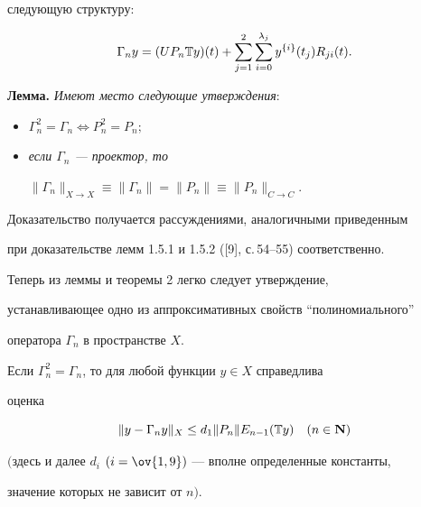 следующую структуру: 


\begin{equation} 


\Gamma_n y=(U P_n\Bbb T y)(t)+\sum^2_{j=1}\sum^{\lambda_j}_{i=0} 


y^{\{i\}}(t_j)R_{j i}(t). 


\end{equation} 


 


{\bf Лемма.} {\it Имеют место следующие утверждения}\/:


\begin{itemize} 


\item[(i)] $\Gamma^2_n=\Gamma_n\Longleftrightarrow P^2_n=P_n;$ 


\item[(ii)] {\it если $\Gamma_n$ --- проектор, то} 


$\|\Gamma_n\|_{X\to X}\equiv\|\Gamma_n\|=\|P_n\|\equiv 


\|P_n\|_{C\to C}$. 


\end{itemize}


\medskip 


 


Доказательство получается рассуждениями, аналогичными приведенным 


при доказательстве лемм 1.5.1 и 1.5.2 ([9], с.\,54--55) соответственно. 


 


Теперь из леммы и теоремы 2 легко следует утверждение, 


устанавливающее одно из аппроксимативных свойств ``полиномиального'' 


оператора $\Gamma_n$ в пространстве $X$. 


 


\begin{thm} 


Если $\Gamma^2_n=\Gamma_n$, то для любой функции $y\in X$ справедлива 


оценка 


$$ 


\|y-\Gamma_n y\|_X\le d_1\|P_n\|E_{n-1}(\Bbb T y)\quad 


(n\in\bold N) 


$$ 


$($здесь и далее $d_i$ $(i=\ov{1,9})$ --- вполне определенные константы, 


значение которых не зависит от $n)$. 


\end{thm} 


